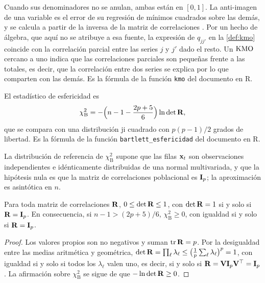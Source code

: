 Cuando sus denominadores no se anulan, ambas están en $[0,1]$. La anti-imagen de una variable es
el error de su regresión de mínimos cuadrados sobre las demás, y se calcula a partir de la inversa
de la matriz de correlaciones \parencite{guttman_1953}. Por un hecho de álgebra, que aquí no se
atribuye a esa fuente, la expresión de $q_{jj'}$ en la \cref{def:kmo} coincide con la correlación
parcial entre las series $j$ y $j'$ dado el resto. Un $\operatorname{KMO}$ cercano a uno indica que las
correlaciones parciales son pequeñas frente a las totales, es decir, que la correlación entre dos
series se explica por lo que comparten con las demás. Es la fórmula de la función \texttt{kmo} del
documento en R.

\begin{definicion}\label{def:bartlett}
El estadístico de esfericidad es
\begin{equation}\label{eq:bartlett}
  \chi^2_{\mathrm B}=-\Bigl(n-1-\frac{2p+5}{6}\Bigr)\ln\det\mathbf{R} ,
\end{equation}
que se compara con una distribución ji cuadrado con $p(p-1)/2$ grados de libertad. Es la fórmula
de la función \texttt{bartlett\_esfericidad} del documento en R.
\end{definicion}

\begin{supuesto}\label{sup:bartlett}
La distribución de referencia de $\chi^2_{\mathrm B}$ supone que las filas $\mathbf{x}_t$ son
observaciones independientes e idénticamente distribuidas de una normal multivariada, y que la
hipótesis nula es que la matriz de correlaciones poblacional es $\mathbf{I}_p$; la aproximación es
asintótica en $n$.
\end{supuesto}

\begin{lema}\label{lem:det}
Para toda matriz de correlaciones $\mathbf{R}$, $0\le\det\mathbf{R}\le1$, con $\det\mathbf{R}=1$ si y solo si
$\mathbf{R}=\mathbf{I}_p$. En consecuencia, si $n-1>(2p+5)/6$, $\chi^2_{\mathrm B}\ge0$, con igualdad si y
solo si $\mathbf{R}=\mathbf{I}_p$.
\end{lema}

\begin{proof}
Los valores propios son no negativos y suman $\operatorname{tr}\mathbf{R}=p$. Por la desigualdad entre las medias
aritmética y geométrica, $\det\mathbf{R}=\prod_\ell\lambda_\ell\le\bigl(\frac1p\sum_\ell\lambda_\ell
\bigr)^p=1$, con igualdad si y solo si todos los $\lambda_\ell$ valen uno, es decir, si y solo si
$\mathbf{R}=\mathbf{V}\mathbf{I}_p\mathbf{V}^{\top}=\mathbf{I}_p$. La afirmación sobre $\chi^2_{\mathrm B}$ se sigue de que
$-\ln\det\mathbf{R}\ge0$.
\end{proof}

